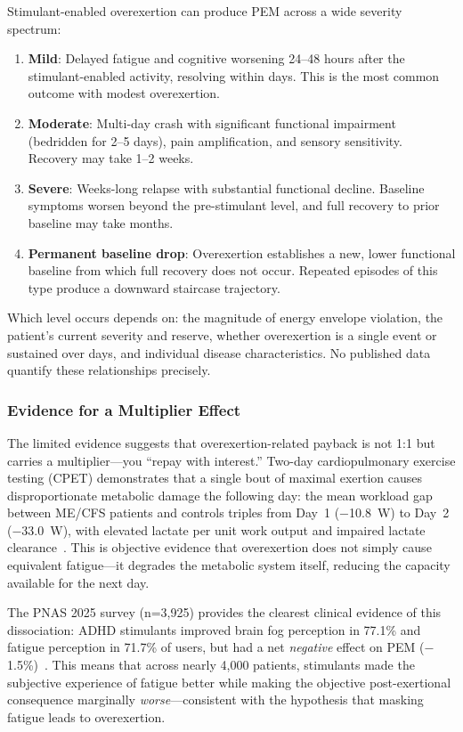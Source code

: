 Stimulant-enabled overexertion can produce PEM across a wide severity spectrum:

\begin{enumerate}
    \item \textbf{Mild}: Delayed fatigue and cognitive worsening 24--48 hours after the stimulant-enabled activity, resolving within days. This is the most common outcome with modest overexertion.
    \item \textbf{Moderate}: Multi-day crash with significant functional impairment (bedridden for 2--5 days), pain amplification, and sensory sensitivity. Recovery may take 1--2 weeks.
    \item \textbf{Severe}: Weeks-long relapse with substantial functional decline. Baseline symptoms worsen beyond the pre-stimulant level, and full recovery to prior baseline may take months.
    \item \textbf{Permanent baseline drop}: Overexertion establishes a new, lower functional baseline from which full recovery does not occur. Repeated episodes of this type produce a downward staircase trajectory.
\end{enumerate}

Which level occurs depends on: the magnitude of energy envelope violation, the patient's current severity and reserve, whether overexertion is a single event or sustained over days, and individual disease characteristics. No published data quantify these relationships precisely.

\subsubsection{Evidence for a Multiplier Effect}

The limited evidence suggests that overexertion-related payback is not 1:1 but carries a multiplier---you ``repay with interest.'' Two-day cardiopulmonary exercise testing (CPET) demonstrates that a single bout of maximal exertion causes disproportionate metabolic damage the following day: the mean workload gap between ME/CFS patients and controls triples from Day~1 ($-$10.8~W) to Day~2 ($-$33.0~W), with elevated lactate per unit work output and impaired lactate clearance~\cite{Farquhar2022twodayCPET}. This is objective evidence that overexertion does not simply cause equivalent fatigue---it degrades the metabolic system itself, reducing the capacity available for the next day.

The PNAS 2025 survey (n=3,925) provides the clearest clinical evidence of this dissociation: ADHD stimulants improved brain fog perception in 77.1\% and fatigue perception in 71.7\% of users, but had a net \textit{negative} effect on PEM ($-$1.5\%)~\cite{Vernon2025PNAS}. This means that across nearly 4,000 patients, stimulants made the subjective experience of fatigue better while making the objective post-exertional consequence marginally \textit{worse}---consistent with the hypothesis that masking fatigue leads to overexertion.

